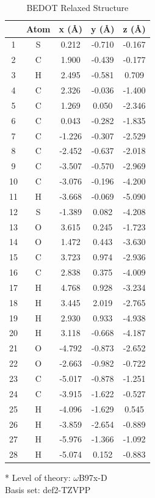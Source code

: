 \begin{table}[hbt!]\centering
\caption{BEDOT Relaxed Structure}
\renewcommand{\arraystretch}{1.25}
\begin{threeparttable}
\begin{tabular}{ccccc}\toprule
{} & {Atom} & {x (\AA)} & {y (\AA)} & {z (\AA)} \\ \midrule
    1 & S & 0.212 & -0.710 & -0.167\\
    2 & C & 1.900 & -0.439 & -0.177\\
    3 & H & 2.495 & -0.581 & 0.709\\
    4 & C & 2.326 & -0.036 & -1.400\\
    5 & C & 1.269 & 0.050 & -2.346\\
    6 & C & 0.043 & -0.282 & -1.835\\
    7 & C & -1.226 & -0.307 & -2.529\\
    8 & C & -2.452 & -0.637 & -2.018\\
    9 & C & -3.507 & -0.570 & -2.969\\
    10 & C & -3.076 & -0.196 & -4.200\\
    11 & H & -3.668 & -0.069 & -5.090\\
    12 & S & -1.389 & 0.082 & -4.208\\
    13 & O & 3.615 & 0.245 & -1.723\\
    14 & O & 1.472 & 0.443 & -3.630\\
    15 & C & 3.723 & 0.974 & -2.936\\
    16 & C & 2.838 & 0.375 & -4.009\\
    17 & H & 4.768 & 0.928 & -3.234\\
    18 & H & 3.445 & 2.019 & -2.765\\
    19 & H & 2.930 & 0.933 & -4.938\\
    20 & H & 3.118 & -0.668 & -4.187\\
    21 & O & -4.792 & -0.873 & -2.652\\
    22 & O & -2.663 & -0.982 & -0.722\\
    23 & C & -5.017 & -0.878 & -1.251\\
    24 & C & -3.915 & -1.622 & -0.527\\
    25 & H & -4.096 & -1.629 & 0.545\\
    26 & H & -3.859 & -2.654 & -0.889\\
    27 & H & -5.976 & -1.366 & -1.092\\
    28 & H & -5.074 & 0.152 & -0.883\\ \bottomrule
\end{tabular}
\begin{tablenotes}
\item[*] \footnotesize Level of theory: $\omega$B97x-D \\ Basis set: def2-TZVPP
\end{tablenotes}
\end{threeparttable}
\end{table}

